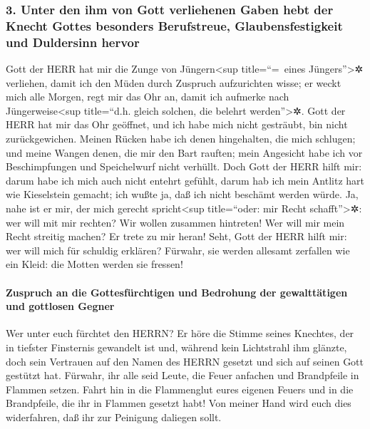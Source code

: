 \hypertarget{unter-den-ihm-von-gott-verliehenen-gaben-hebt-der-knecht-gottes-besonders-berufstreue-glaubensfestigkeit-und-duldersinn-hervor}{%
\subsubsection{3. Unter den ihm von Gott verliehenen Gaben hebt der
Knecht Gottes besonders Berufstreue, Glaubensfestigkeit und Duldersinn
hervor}\label{unter-den-ihm-von-gott-verliehenen-gaben-hebt-der-knecht-gottes-besonders-berufstreue-glaubensfestigkeit-und-duldersinn-hervor}}

Gott der HERR hat mir die Zunge von Jüngern\textless sup
title=``=~eines Jüngers''\textgreater✲ verliehen, damit ich den Müden
durch Zuspruch aufzurichten wisse; er weckt mich alle Morgen, regt mir
das Ohr an, damit ich aufmerke nach Jüngerweise\textless sup
title=``d.h. gleich solchen, die belehrt werden''\textgreater✲.
Gott der HERR hat mir das Ohr geöffnet, und ich habe mich
nicht gesträubt, bin nicht zurückgewichen. Meinen Rücken
habe ich denen hingehalten, die mich schlugen; und meine Wangen denen,
die mir den Bart rauften; mein Angesicht habe ich vor Beschimpfungen und
Speichelwurf nicht verhüllt. Doch Gott der HERR hilft mir:
darum habe ich mich auch nicht entehrt gefühlt, darum hab ich mein
Antlitz hart wie Kieselstein gemacht; ich wußte ja, daß ich nicht
beschämt werden würde. Ja, nahe ist er mir, der mich
gerecht spricht\textless sup title=``oder: mir Recht
schafft''\textgreater✲: wer will mit mir rechten? Wir wollen zusammen
hintreten! Wer will mir mein Recht streitig machen? Er trete zu mir
heran! Seht, Gott der HERR hilft mir: wer will mich für
schuldig erklären? Fürwahr, sie werden allesamt zerfallen wie ein Kleid:
die Motten werden sie fressen!

\hypertarget{zuspruch-an-die-gottesfuxfcrchtigen-und-bedrohung-der-gewalttuxe4tigen-und-gottlosen-gegner}{%
\paragraph{Zuspruch an die Gottesfürchtigen und Bedrohung der
gewalttätigen und gottlosen
Gegner}\label{zuspruch-an-die-gottesfuxfcrchtigen-und-bedrohung-der-gewalttuxe4tigen-und-gottlosen-gegner}}

Wer unter euch fürchtet den HERRN? Er höre die Stimme
seines Knechtes, der in tiefster Finsternis gewandelt ist und, während
kein Lichtstrahl ihm glänzte, doch sein Vertrauen auf den Namen des
HERRN gesetzt und sich auf seinen Gott gestützt hat.
Fürwahr, ihr alle seid Leute, die Feuer anfachen und
Brandpfeile in Flammen setzen. Fahrt hin in die Flammenglut eures
eigenen Feuers und in die Brandpfeile, die ihr in Flammen gesetzt habt!
Von meiner Hand wird euch dies widerfahren, daß ihr zur Peinigung
daliegen sollt.

